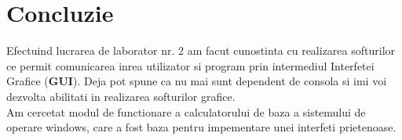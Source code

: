 \section*{Concluzie}
Efectuind lucrarea de laborator nr. 2 am facut cunostinta cu realizarea softurilor ce permit comunicarea inrea utilizator si program prin intermediul Interfetei Grafice (\textbf{GUI}).
Deja pot spune ca nu mai sunt dependent de consola si imi voi dezvolta abilitati in realizarea softurilor grafice.\\
Am cercetat modul de functionare a calculatorului de baza a sistemului de operare windows, care a fost baza pentru impementare unei interfeti prietenoase.
